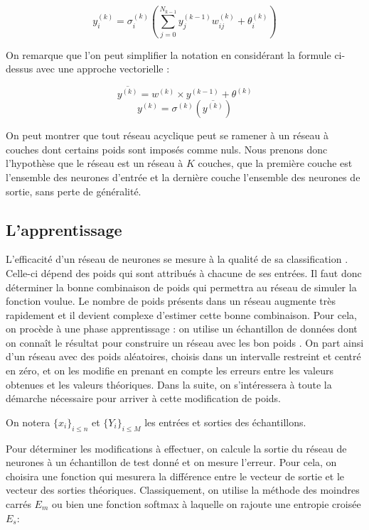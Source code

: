 \[y_i^{(k)} = \sigma_i^{(k)}(\sum_{j = 0}^{N_{k-1}} y_j^{(k-1)}w_{ij}^{(k)} + \theta_i^{(k)}) \]

On remarque que l'on peut simplifier la notation en considérant la formule
ci-dessus avec une approche vectorielle :

\[\overline{y^{(k)}} = w^{(k)} \times y^{(k-1)} + \theta^{(k)}\]
\[y^{(k)} = \sigma^{(k)}(\overline{y^{(k)}}) \]

On peut montrer que tout réseau acyclique peut se ramener à un réseau à couches
dont certains poids sont imposés comme nuls. Nous prenons donc l'hypothèse que
le réseau est un réseau à $K$ couches, que la première couche est l'ensemble des
 neurones d'entrée et la dernière couche l'ensemble des neurones de sortie, sans
 perte de généralité.

\subsection{L'apprentissage}

L'efficacité d'un réseau de neurones se mesure à la qualité de sa classification
. Celle-ci dépend des poids qui sont attribués à chacune de ses entrées. Il faut
donc déterminer la bonne combinaison de poids qui permettra au réseau de
simuler la fonction voulue. Le nombre de poids présents dans un réseau augmente
très rapidement et il devient complexe d'estimer cette bonne combinaison. Pour
cela, on procède à une phase apprentissage : on utilise un échantillon de
données dont on connaît le résultat pour construire un réseau avec les bon poids
. On part ainsi d'un réseau avec des poids aléatoires, choisis dans un
intervalle restreint et centré en zéro, et on les modifie en prenant en compte
les erreurs entre les valeurs obtenues et les valeurs théoriques. Dans la suite,
on s'intéressera à toute la démarche nécessaire pour arriver à cette
modification de poids.

\medskip

On notera $\{x_i\}_{i \leq n}$ et $\{Y_i\}_{i \leq M}$ les entrées et sorties
des échantillons.

\medskip

Pour déterminer les modifications à effectuer, on calcule la sortie du réseau de
 neurones à un échantillon de test donné et on mesure l'erreur. Pour cela,
on choisira une fonction qui mesurera la différence entre le vecteur de sortie
et le vecteur des sorties théoriques. Classiquement, on utilise la méthode des
moindres carrés $E_m$ ou bien une fonction softmax à laquelle on rajoute une
entropie croisée $E_s$:


